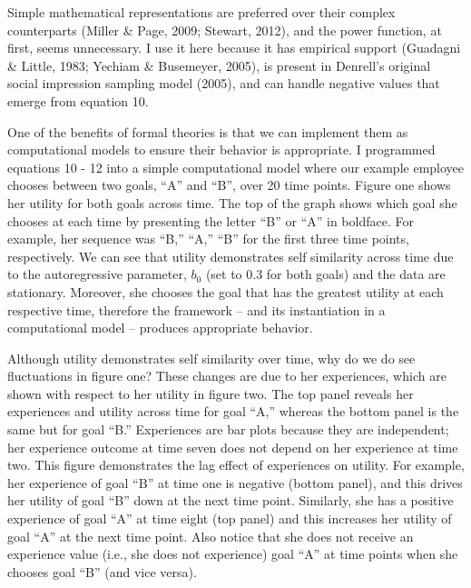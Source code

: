 \documentclass[english,man]{apa6}
\theoremstyle{definition}
\theoremstyle{definition}
\theoremstyle{definition}
\theoremstyle{remark}
\begin{document}
Simple mathematical representations are preferred over their complex
counterparts (Miller \& Page, 2009; Stewart, 2012), and the power
function, at first, seems unnecessary. I use it here because it has
empirical support (Guadagni \& Little, 1983; Yechiam \& Busemeyer,
2005), is present in Denrell's original social impression sampling model
(2005), and can handle negative values that emerge from equation 10.

One of the benefits of formal theories is that we can implement them as
computational models to ensure their behavior is appropriate. I
programmed equations 10 - 12 into a simple computational model where our
example employee chooses between two goals, \enquote{A} and \enquote{B},
over 20 time points. Figure one shows her utility for both goals across
time. The top of the graph shows which goal she chooses at each time by
presenting the letter \enquote{B} or \enquote{A} in boldface. For
example, her sequence was \enquote{B,} \enquote{A,} \enquote{B} for the
first three time points, respectively. We can see that utility
demonstrates self similarity across time due to the autoregressive
parameter, \(b_0\) (set to 0.3 for both goals) and the data are
stationary. Moreover, she chooses the goal that has the greatest utility
at each respective time, therefore the framework -- and its
instantiation in a computational model -- produces appropriate behavior.

Although utility demonstrates self similarity over time, why do we do
see fluctuations in figure one? These changes are due to her
experiences, which are shown with respect to her utility in figure two.
The top panel reveals her experiences and utility across time for goal
\enquote{A,} whereas the bottom panel is the same but for goal
\enquote{B.} Experiences are bar plots because they are independent; her
experience outcome at time seven does not depend on her experience at
time two. This figure demonstrates the lag effect of experiences on
utility. For example, her experience of goal \enquote{B} at time one is
negative (bottom panel), and this drives her utility of goal \enquote{B}
down at the next time point. Similarly, she has a positive experience of
goal \enquote{A} at time eight (top panel) and this increases her
utility of goal \enquote{A} at the next time point. Also notice that she
does not receive an experience value (i.e., she does not experience)
goal \enquote{A} at time points when she chooses goal \enquote{B} (and
vice versa).
\end{document}
